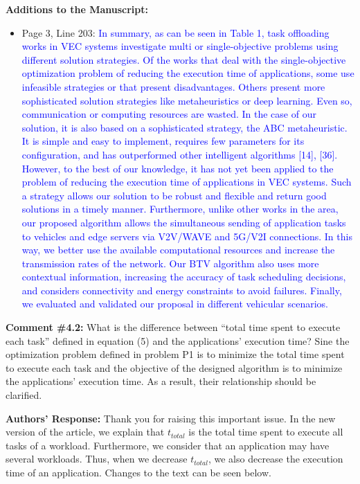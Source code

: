 \textbf{Additions to the Manuscript:}

\begin{itemize}
    \item Page 3, Line 203: \textcolor{blue}{In summary, as can be seen in Table 1, task offloading works in VEC systems investigate multi or single-objective problems using different solution strategies. Of the works that deal with the single-objective optimization problem of reducing the execution time of applications, some use infeasible strategies or that present disadvantages. Others present more sophisticated solution strategies like metaheuristics or deep learning. Even so, communication or computing resources are wasted. In the case of our solution, it is also based on a sophisticated strategy, the ABC metaheuristic. It is simple and easy to implement, requires few parameters for its configuration, and has outperformed other intelligent algorithms [14], [36]. However, to the best of our knowledge, it has not yet been applied to the problem of reducing the execution time of applications in VEC systems. Such a strategy allows our solution to be robust and flexible and return good solutions in a timely manner. Furthermore, unlike other works in the area, our proposed algorithm allows the simultaneous sending of application tasks to vehicles and edge servers via V2V/WAVE and 5G/V2I connections. In this way, we better use the available computational resources and increase the transmission rates of the network. Our BTV algorithm also uses more contextual information, increasing the accuracy of task scheduling decisions, and considers connectivity and energy constraints to avoid failures. Finally, we evaluated and validated our proposal in different vehicular scenarios.}    
\end{itemize}

\vspace{\baselineskip}

\begin{mdframed}[style=review] 
\textbf{Comment \#4.2:} What is the difference between “total time spent to execute each task” defined in equation (5) and the applications’ execution time? Sine the optimization problem defined in problem P1 is to minimize the total time spent to execute each task and the objective of the designed algorithm is to minimize the applications’ execution time. As a result, their relationship should be clarified.
\end{mdframed}

\textbf{Authors' Response:} Thank you for raising this important issue. In the new version of the article, we explain that $t_{total}$ is the total time spent to execute all tasks of a workload. Furthermore, we consider that an application may have several workloads. Thus, when we decrease $t_{total}$, we also decrease the execution time of an application. Changes to the text can be seen below.   


